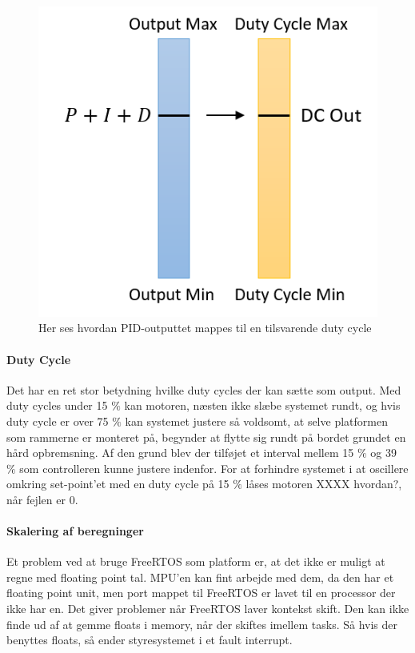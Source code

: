 \begin{figure}
	\begin{center}
	\includegraphics[scale=0.8]{Billeder/Mapping.png}
	\end{center}		
	\caption{Her ses hvordan PID-outputtet mappes til en tilsvarende duty cycle}
	\label{fig:Mapping}	
\end{figure}
\paragraph{Duty Cycle}

Det har en ret stor betydning hvilke duty cycles der kan sætte som output. Med duty cycles under 15 $\%$ kan motoren, næsten ikke slæbe systemet rundt, og hvis duty cycle er over 75 $\%$ kan systemet justere så voldsomt, at selve platformen som rammerne er monteret på, begynder at flytte sig rundt på bordet grundet en hård opbremsning. Af den grund blev der tilføjet et interval mellem 15 $\%$ og 39 $\%$ som controlleren kunne justere indenfor. For at forhindre systemet i at oscillere omkring set-point'et med en duty cycle på 15 $\%$ låses motoren XXXX hvordan?, når fejlen er 0.

\paragraph{Skalering af beregninger}

Et problem ved at bruge FreeRTOS som platform er, at det ikke er muligt at regne med floating point tal. MPU'en kan fint arbejde med dem, da den har et floating point unit, men port mappet til FreeRTOS er lavet til en processor der ikke har en. Det giver problemer når FreeRTOS laver kontekst skift. Den kan ikke finde ud af at gemme floats i memory, når der skiftes imellem tasks. Så hvis der benyttes floats, så ender styresystemet i et fault interrupt.

